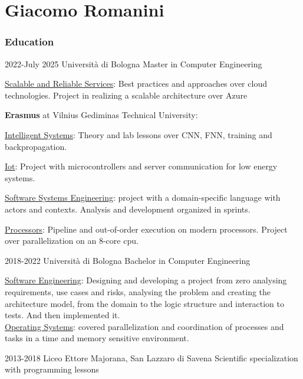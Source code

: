 \documentclass{tccv}
\begin{document}
\part{Giacomo Romanini}


\section{Education}

\hfill

\begin{eventlist}

      \item{2022-July 2025}
            {Università di Bologna}
            {Master in Computer Engineering}

      \underline{Scalable and Reliable Services}: Best practices and approaches over cloud technologies. Project in realizing a scalable architecture over Azure

      \textbf{Erasmus} at Vilnius Gediminas Technical University:

      \quad \underline{Intelligent Systems}: Theory and lab lessons over CNN, FNN, training and backpropagation.

      \quad \underline{Iot}: Project with microcontrollers and server communication for low energy systems.

      \underline{Software Systems Engineering}: project with a domain-specific language with actors and contexts. Analysis and development organized in sprints.

      \underline{Processors}: Pipeline and out-of-order execution on modern processors. Project over parallelization on an 8-core cpu.

      \item{2018-2022}
            {Università di Bologna}
            {Bachelor in Computer Engineering}

      \underline{Software Engineering}: Designing and developing a project from zero analysing requirements, use cases and risks, analysing the problem and creating the architecture model, from the domain to the logic structure and interaction to tests. And then implemented it.\\
      \underline{Operating Systems}: covered parallelization and coordination of processes and tasks in a time and memory sensitive environment.

      \item{2013-2018}
            {Liceo Ettore Majorana, San Lazzaro di Savena}
            {Scientific specialization with programming lessons}
\end{eventlist}
\end{document}
